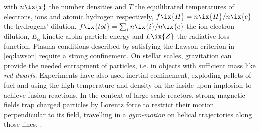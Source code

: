 %
        with $n\ix{x}$ the number densities and $T$ the equilibrated temperatures of electrons, ions and atomic hydrogen respectively, $f\ix{H}=n\ix{H}/n\ix{e}$ the hydrogens' dilution, $f\ix{tot}=\sum_{i}n\ix{i}/n\ix{e}$ the ion-electron dilution, $E_{\alpha}$ kinetic alpha particle energy and $L\ix{Z}$ the radiative loss function. Plasma conditions described by satisfying the Lawson criterion in \cref{eq:lawson} require a strong confinement. On stellar scales, gravitation can provide the needed entrapment of particles, i.e. in objects with sufficient mass like \textit{red dwarfs}. Experiments have also used inertial confinement, exploding pellets of fuel and using the high temperature and density on the inside upon implosion to achieve fusion reactions. In the context of large scale reactors, strong magnetic fields trap charged particles by Lorentz force to restrict their motion perpendicular to its field, travelling in a \textit{gyro-motion} on helical trajectories along those lines. \cite{Helander2014,Boozer2015}.\\%
